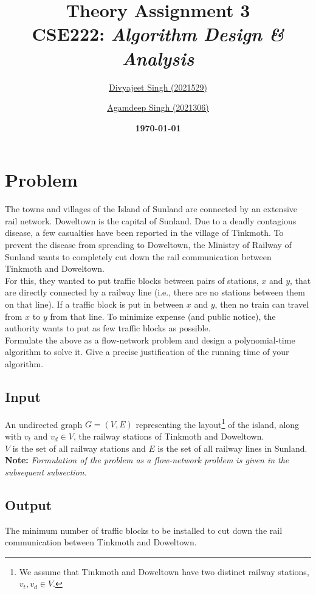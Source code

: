 \documentclass[12pt]{report}
\title{
    \textbf{\Huge{Theory Assignment 3}} \\
    \vspace*{15pt}
    \large{CSE222: \textit{Algorithm Design \& Analysis}}
}
\author{
    \href{mailto:divyajeet21529@iiitd.ac.in}{Divyajeet Singh (2021529)}
    \and
    \href{mailto:agamdeep21306@iiitd.ac.in}{Agamdeep Singh (2021306)}
}
\date{
    \vspace*{10pt}
    \textbf{\today}
}
\begin{document}
    \maketitle

    \section*{\huge{Problem}}
    The towns and villages of the Island of Sunland are connected by an extensive rail network.
    Doweltown is the capital of Sunland. Due to a deadly contagious disease,
    a few casualties have been reported in the village of Tinkmoth. To prevent the disease from
    spreading to Doweltown, the Ministry of Railway of Sunland wants to completely
    cut down the rail communication between Tinkmoth and Doweltown. \\
    For this, they wanted to put traffic blocks between pairs of stations, $x$ and $y$, that are
    directly connected by a railway line (i.e., there are no stations between them on that line).
    If a traffic block is put in between $x$ and $y$, then no train can travel from $x$ to $y$ from that
    line. To minimize expense (and public notice), the authority wants to put as few traffic blocks
    as possible. \\
    Formulate the above as a flow-network problem and design a polynomial-time algorithm to
    solve it. Give a precise justification of the running time of your algorithm.

    \subsection*{Input}
    An undirected graph $G = (V, E)$ representing the layout\footnote{
        We assume that Tinkmoth and Doweltown have two distinct railway stations, $v_{t}, v_{d} \in V$.
    } of the island, along with $v_{t}$ and $v_{d} \in V$, the railway stations of Tinkmoth and Doweltown. \\
    $V$ is the set of all railway stations and $E$ is the set of all railway lines in Sunland.
    \vspace*{7.5pt} \\
    \textbf{Note:} \textit{Formulation of the problem as a flow-network problem is given in the subsequent subsection.}

    \subsection*{Output}
    The minimum number of traffic blocks to be installed to cut down the rail communication between Tinkmoth and Doweltown.
\end{document}

